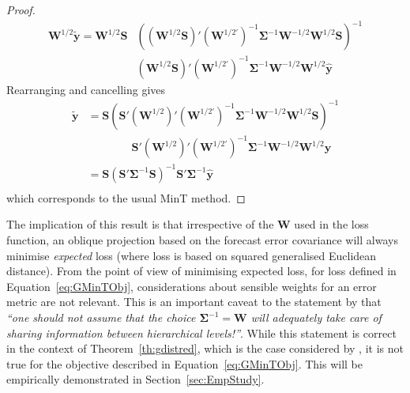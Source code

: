\documentclass[12pt]{article}
\theoremstyle{definition}
\begin{document}
{\begin{proof}
	\begin{align*}
	\bm{W}^{1/2}\tilde{\bm{y}}=\bm{W}^{1/2}\bm{S}&\left((\bm{W}^{1/2}\bm{S})'(\bm{W}^{1/2'})^{-1}\bm{\Sigma}^{-1}\bm{W}^{-1/2}\bm{W}^{1/2}\bm{S}\right)^{-1}\\
	&(\bm{W}^{1/2}\bm{S})'(\bm{W}^{1/2'})^{-1}\bm{\Sigma}^{-1}\bm{W}^{-1/2}\bm{W}^{1/2}\hat{\bm{y}}
	\end{align*}
	Rearranging and cancelling gives
	\begin{align*}
    \tilde{\bm{y}}&=\bm{S}\left(\bm{S}'(\bm{W}^{1/2})'(\bm{W}^{1/2'})^{-1}\bm{\Sigma}^{-1}\bm{W}^{-1/2}\bm{W}^{1/2}\bm{S}\right)^{-1}\\
    &\qquad\qquad\bm{S}'(\bm{W}^{1/2})'(\bm{W}^{1/2'})^{-1}\bm{\Sigma}^{-1}\bm{W}^{-1/2}\bm{W}^{1/2}\hat{\bm{y}}\\
	&=\bm{S}\left(\bm{S}'\bm{\Sigma}^{-1}\bm{S}\right)^{-1}\bm{S}'\bm{\Sigma}^{-1}\hat{\bm{y}}\\
	\end{align*}
	which corresponds to the usual MinT method.
\end{proof}

The implication of this result is that irrespective of the ${\bm W}$ used in the loss function, an oblique projection based on the forecast error covariance will always minimise {\em expected} loss (where loss is based on squared generalised Euclidean distance).  From the point of view of minimising expected loss, for loss defined in Equation~\ref{eq:GMinTObj}, considerations about sensible weights for an error metric are not relevant.  This is an important caveat to the statement by \cite{VanErven2015a} that \textit{``one should not assume that the choice ${\bm\Sigma}^{-1}=\bm{W}$ will adequately take care of sharing information between hierarchical levels!''}.  While this statement is correct in the context of Theorem~\ref{th:gdistred}, which is the case considered by \cite{VanErven2015a}, it is not true for the objective described in Equation~\ref{eq:GMinTObj}. This will be empirically demonstrated in Section~\ref{sec:EmpStudy}.}
\end{document}
